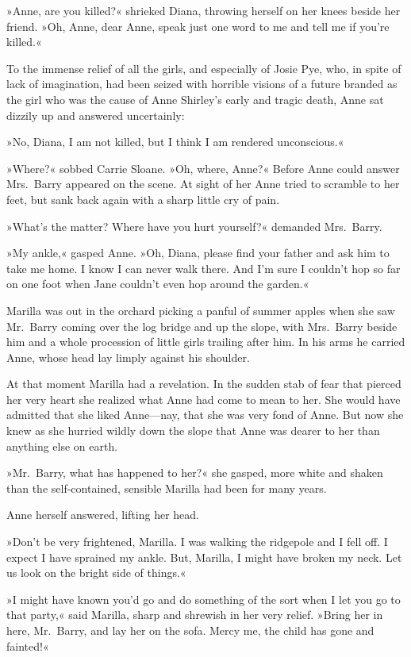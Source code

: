 »Anne, are you killed?« shrieked Diana, throwing herself on her knees beside her friend. »Oh, Anne, dear Anne, speak just one word to me and tell me if you're killed.«

To the immense relief of all the girls, and especially of Josie Pye, who, in spite of lack of imagination, had been seized with horrible visions of a future branded as the girl who was the cause of Anne Shirley's early and tragic death, Anne sat dizzily up and answered uncertainly:

»No, Diana, I am not killed, but I think I am rendered unconscious.«

»Where?« sobbed Carrie Sloane. »Oh, where, Anne?« Before Anne could answer Mrs.~Barry appeared on the scene. At sight of her Anne tried to scramble to her feet, but sank back again with a sharp little cry of pain.

»What's the matter? Where have you hurt yourself?« demanded Mrs.~Barry.

»My ankle,« gasped Anne. »Oh, Diana, please find your father and ask him to take me home. I know I can never walk there. And I'm sure I couldn't hop so far on one foot when Jane couldn't even hop around the garden.«

Marilla was out in the orchard picking a panful of summer apples when she saw Mr.~Barry coming over the log bridge and up the slope, with Mrs.~Barry beside him and a whole procession of little girls trailing after him. In his arms he carried Anne, whose head lay limply against his shoulder.

At that moment Marilla had a revelation. In the sudden stab of fear that pierced her very heart she realized what Anne had come to mean to her. She would have admitted that she liked Anne—nay, that she was very fond of Anne. But now she knew as she hurried wildly down the slope that Anne was dearer to her than anything else on earth.

»Mr.~Barry, what has happened to her?« she gasped, more white and shaken than the self-contained, sensible Marilla had been for many years.

Anne herself answered, lifting her head.

»Don't be very frightened, Marilla. I was walking the ridgepole and I fell off. I expect I have sprained my ankle. But, Marilla, I might have broken my neck. Let us look on the bright side of things.«

»I might have known you'd go and do something of the sort when I let you go to that party,« said Marilla, sharp and shrewish in her very relief. »Bring her in here, Mr.~Barry, and lay her on the sofa. Mercy me, the child has gone and fainted!«

